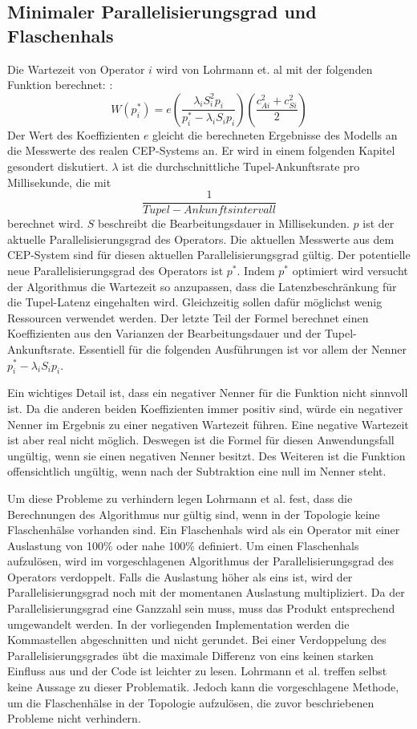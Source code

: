 \subsection{Minimaler Parallelisierungsgrad und Flaschenhals}
Die Wartezeit von Operator \(i\) wird von Lohrmann et. al mit der folgenden Funktion berechnet: \cite{lohrmann_elastic_2015}:
\[W(p_i^\ast) = e \left( \frac{\lambda_i {S}^{2}_{i} p_i}{p_i^\ast-\lambda_i {S}_i p_i}\right)\left(\frac{{c^{2}_{Ai}} + {c^{2}_{Si}}}{2}\right)\]
Der Wert des Koeffizienten \(e\) gleicht die berechneten Ergebnisse des Modells an die Messwerte des realen CEP-Systems an.
Er wird in einem folgenden Kapitel gesondert diskutiert.
\(\lambda\) ist die durchschnittliche Tupel-Ankunftsrate pro Millisekunde, die mit \[\frac{1}{Tupel-Ankunftsintervall}\] berechnet wird. 
\({S}\) beschreibt die Bearbeitungsdauer in Millisekunden.
\(p\) ist der aktuelle Parallelisierungsgrad des Operators.
Die aktuellen Messwerte aus dem CEP-System sind für diesen aktuellen Parallelisierungsgrad gültig.
Der potentielle neue Parallelisierungsgrad des Operators ist \(p^\ast\).
Indem \(p^\ast\) optimiert wird versucht der Algorithmus die Wartezeit so anzupassen, dass die Latenzbeschränkung für die Tupel-Latenz eingehalten wird.
Gleichzeitig sollen dafür möglichst wenig Ressourcen verwendet werden.
Der letzte Teil der Formel berechnet einen Koeffizienten aus den Varianzen der Bearbeitungsdauer und der Tupel-Ankunftsrate.
Essentiell für die folgenden Ausführungen ist vor allem der Nenner \(p_i^\ast-\lambda_i {S}_i p_i\).

Ein wichtiges Detail ist, dass ein negativer Nenner für die Funktion nicht sinnvoll ist.
Da die anderen beiden Koeffizienten immer positiv sind, würde ein negativer Nenner im Ergebnis zu einer negativen Wartezeit führen.
Eine negative Wartezeit ist aber real nicht möglich.
Deswegen ist die Formel für diesen Anwendungsfall ungültig, wenn sie einen negativen Nenner besitzt.
Des Weiteren ist die Funktion offensichtlich ungültig, wenn nach der Subtraktion eine null im Nenner  steht.

Um diese Probleme zu verhindern legen Lohrmann et al. fest, dass die Berechnungen des Algorithmus nur gültig sind, wenn in der Topologie keine Flaschenhälse vorhanden sind.
Ein Flaschenhals wird als ein Operator mit einer Auslastung von 100\% oder nahe 100\% definiert.
Um einen Flaschenhals aufzulösen, wird im vorgeschlagenen Algorithmus der Parallelisierungsgrad des Operators verdoppelt. Falls die Auslastung höher als eins ist, wird der Parallelisierungsgrad noch mit der momentanen Auslastung multipliziert. Da der Parallelisierungsgrad eine Ganzzahl sein muss, muss das Produkt entsprechend umgewandelt werden. In der vorliegenden Implementation werden die Kommastellen abgeschnitten und nicht gerundet. Bei einer Verdoppelung des Parallelisierungsgrades übt die maximale Differenz von eins keinen starken Einfluss aus und der Code ist leichter zu lesen. Lohrmann et al. treffen selbst keine Aussage zu dieser Problematik.
Jedoch kann die vorgeschlagene Methode, um die Flaschenhälse in der Topologie aufzulösen, die zuvor beschriebenen Probleme nicht verhindern.

